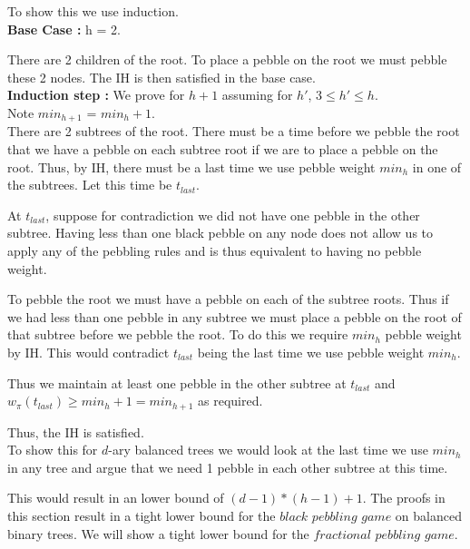 \documentclass[12pt]{article}
\begin{document}
\noindent
To show this we use induction.\\







\noindent
{\bf Base Case :} h = 2.

There are 2 children of the root. To place a pebble on the root we must pebble these 2 nodes. The IH is then satisfied in the base case.\\


\noindent
{\bf Induction step :} We prove for $h+1$ assuming for $h'$,
$3\le h' \le h$.\\
Note $min_{h+1}$ = $min_h + 1$.\\

There are 2 subtrees of the root. There must be a time before we pebble the root that we have a pebble on each subtree root if we are to place a pebble on the root. Thus, by IH, there must be a last time we use pebble weight $min_h$ in one of the subtrees. Let this time be $t_{last}$. 

At $t_{last}$, suppose for contradiction we did not have one pebble in the other subtree.  Having less than one black pebble on any node does not allow us to apply any of the pebbling rules and is thus equivalent to having no pebble weight.

To pebble the root we must have a pebble on each of the subtree roots. Thus if we had less than one pebble in any subtree we must place a pebble on the root of that subtree before we pebble the root. To do this we require $min_h$ pebble weight by IH. This would contradict $t_{last}$ being the last time we use pebble weight $min_h$.

Thus we maintain at least one pebble in the other subtree at $t_{last}$ and $w_\pi(t_{last}) \geq min_h + 1 = min_{h + 1}$ as required.

Thus, the IH is satisfied.\\

To show this for $d$-ary balanced trees we would look at the last time we use $min_h$ in any tree and argue that we need 1 pebble in each other subtree at this time. 

This would result in an lower bound of $(d-1) * (h-1) + 1$. The proofs in this section result in a tight lower bound for the $black$ $pebbling$ $game$ on balanced binary trees. We will show a tight lower bound for the $fractional $ $pebbling$ $game$.
\end{document}
